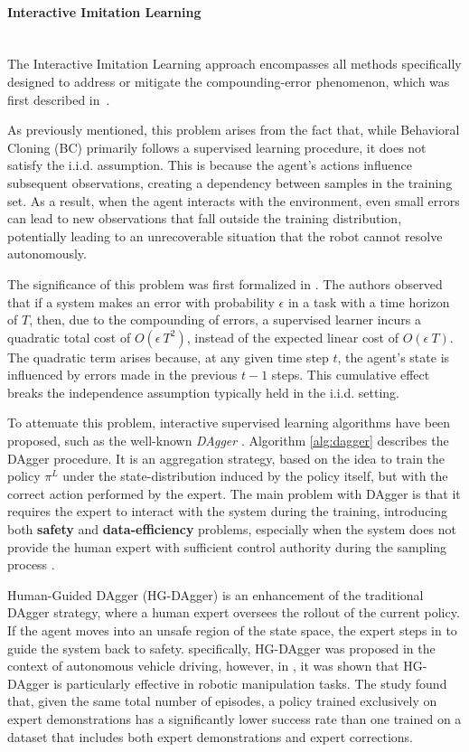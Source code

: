 \paragraph*{Interactive Imitation Learning}\mbox{}\\
The Interactive Imitation Learning approach encompasses all methods specifically designed to address or mitigate the compounding-error phenomenon, which was first described in~\cite{pomerleau1988alvinn}.

As previously mentioned, this problem arises from the fact that, while Behavioral Cloning (BC) primarily follows a supervised learning procedure, it does not satisfy the i.i.d. assumption. This is because the agent's actions influence subsequent observations, creating a dependency between samples in the training set. As a result, when the agent interacts with the environment, even small errors can lead to new observations that fall outside the training distribution, potentially leading to an unrecoverable situation that the robot cannot resolve autonomously.

The significance of this problem was first formalized in \cite{ross2010efficient_reductions}. The authors observed that if a system makes an error with probability $\epsilon$ in a task with a time horizon of $T$, then, due to the compounding of errors, a supervised learner incurs a quadratic total cost of $O(\epsilon \ T^{2})$, instead of the expected linear cost of $O(\epsilon \ T)$. The quadratic term arises because, at any given time step $t$, the agent's state is influenced by errors made in the previous $t-1$ steps. This cumulative effect breaks the independence assumption typically held in the i.i.d. setting.

To attenuate this problem, interactive supervised learning algorithms have been proposed, such as the well-known \textit{DAgger} \cite{ross2011dagger}. Algorithm \ref{alg:dagger} describes the DAgger procedure. It is an aggregation strategy, based on the idea to train the policy $\pi^{L}$ under the state-distribution induced by the policy itself, but with the correct action performed by the expert. The main problem with DAgger is that it requires the expert to interact with the system during the training, introducing both \textbf{safety} and \textbf{data-efficiency} problems, especially when the system does not provide the human expert with sufficient control authority during the sampling process \cite{laskey2017comparing_hc_rc}. 


Human-Guided DAgger (HG-DAgger) \cite{kelly2019hg_dagger} is an enhancement of the traditional DAgger strategy, where a human expert oversees the rollout of the current policy. If the agent moves into an unsafe region of the state space, the expert steps in to guide the system back to safety. specifically, HG-DAgger was proposed in the context of autonomous vehicle driving, however, in \cite{jang2022bc_z}, it was shown that HG-DAgger is particularly effective in robotic manipulation tasks. The study found that, given the same total number of episodes, a policy trained exclusively on expert demonstrations has a significantly lower success rate than one trained on a dataset that includes both expert demonstrations and expert corrections.


